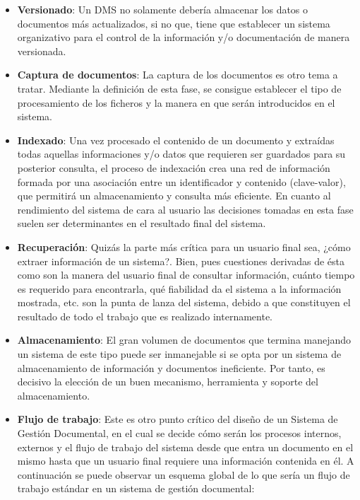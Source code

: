 \documentclass[runningheads,a4paper]{llncs}
\theoremstyle{break}
\begin{document}
\begin{itemize}
  \item \textbf{Versionado}: Un DMS no solamente debería almacenar los datos o documentos más actualizados, si no que, tiene que establecer un sistema organizativo para el control de la información y/o documentación de manera versionada.

  \item \textbf{Captura de documentos}: La captura de los documentos es otro tema a tratar. Mediante la definición de esta fase, se consigue establecer el tipo de procesamiento de los  ficheros y la manera en que serán introducidos en el sistema.

  \item \textbf{Indexado}: Una vez procesado el contenido de un documento y extraídas todas aquellas informaciones y/o datos que requieren ser guardados para su posterior consulta, el proceso de indexación crea una red de información formada por una asociación entre un identificador y contenido (clave-valor), que permitirá un almacenamiento y consulta más eficiente. 
  En cuanto al rendimiento del sistema de cara al usuario las decisiones tomadas en esta fase suelen ser determinantes en el resultado final del sistema.

  \item \textbf{Recuperación}: Quizás la parte más crítica para un usuario final sea, ¿cómo extraer información de un sistema?. Bien, pues cuestiones derivadas de ésta como son la manera del usuario final de consultar información, cuánto tiempo es requerido para encontrarla, qué fiabilidad da el sistema a la información mostrada, etc. son la punta de lanza del sistema, debido a que constituyen el resultado de todo el trabajo que es realizado internamente.

  \item \textbf{Almacenamiento}: El gran volumen de documentos que termina manejando un sistema de este tipo puede ser inmanejable si se opta por un sistema de almacenamiento de información y documentos ineficiente. Por tanto, es decisivo la elección de un buen mecanismo, herramienta y soporte del almacenamiento.
  
  \item \textbf{Flujo de trabajo}: Este es otro punto crítico del diseño de un Sistema de Gestión Documental, en el cual se decide cómo serán los procesos internos, externos y el flujo de trabajo del sistema desde que entra un documento en el mismo hasta que un usuario final requiere una información contenida en él. A continuación se puede observar un esquema global de lo que sería un flujo de trabajo estándar en un sistema de gestión documental:


\end{itemize}
\end{document}
